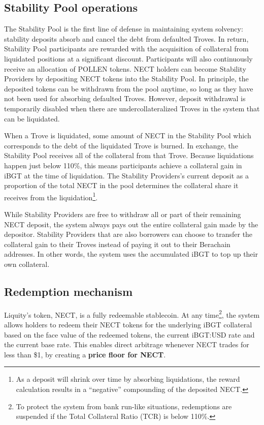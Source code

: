 \documentclass{article}
\begin{document}
\subsection{Stability Pool operations}
The Stability Pool is the first line of defense in maintaining system solvency: stability deposits absorb and cancel the debt from defaulted Troves. In return, Stability Pool participants are rewarded with the acquisition of collateral from liquidated positions at a significant discount. Participants will also continuously receive an allocation of POLLEN tokens.
NECT holders can become Stability Providers by depositing NECT tokens into the Stability Pool. In principle, the deposited tokens can be withdrawn from the pool anytime, so long as they have not been used for absorbing defaulted Troves. However, deposit withdrawal is temporarily disabled when there are undercollateralized Troves in the system that can be liquidated.

When a Trove is liquidated, some amount of NECT in the Stability Pool which corresponds to the debt of the liquidated Trove is burned. In exchange, the Stability Pool receives all of the collateral from that Trove. Because liquidations happen just below 110\%, this means participants achieve a collateral gain in iBGT at the time of liquidation. The Stability Providers’s current deposit as a proportion of the total NECT in the pool determines the collateral share it receives from the liquidation\footnote{As a deposit will shrink over time by absorbing liquidations, the reward calculation results in a “negative” compounding of the deposited NECT.}. 

While Stability Providers are free to withdraw all or part of their remaining NECT deposit, the system always pays out the entire collateral gain made by the depositor. Stability Providers that are also borrowers can choose to transfer the collateral gain to their Troves instead of paying it out to their Berachain addresses. In other words, the system uses the accumulated iBGT to top up their own collateral. 

\subsection{Redemption mechanism}
Liquity’s token, NECT, is a fully redeemable stablecoin. At any time\footnote{To protect the system from bank run-like situations, redemptions are suspended if the Total Collateral Ratio (TCR) is below 110\%.}, the system allows holders to redeem their NECT tokens for the underlying iBGT collateral based on the face value of the redeemed tokens, the current iBGT:USD rate and the current base rate. This enables direct arbitrage whenever NECT trades for less than \$1, by creating a \textbf{price floor for NECT}.\\
\end{document}
